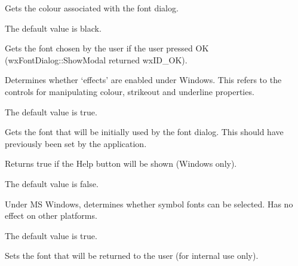 Gets the colour associated with the font dialog.

The default value is black.

\label{wxfontdatagetchosenfont}


Gets the font chosen by the user if the user pressed OK (wxFontDialog::ShowModal returned wxID\_OK).

\label{wxfontdatagetenableeffects}


Determines whether `effects' are enabled under Windows. This refers to the
controls for manipulating colour, strikeout and underline properties.

The default value is true.

\label{wxfontdatagetinitialfont}


Gets the font that will be initially used by the font dialog. This should have
previously been set by the application.

\label{wxfontdatagetshowhelp}


Returns true if the Help button will be shown (Windows only).

The default value is false.

\label{wxfontdatasetallowsymbols}


Under MS Windows, determines whether symbol fonts can be selected. Has no
effect on other platforms.

The default value is true.

\label{wxfontdatasetchosenfont}


Sets the font that will be returned to the user (for internal use only).

\label{wxfontdatasetcolour}


